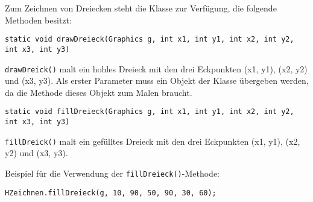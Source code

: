 Zum Zeichnen von Dreiecken steht die Klasse  zur Verfügung,
die folgende Methoden besitzt:

\begin{compactitem}
\item
\lstinline|static void drawDreieck(Graphics g, int x1, int y1, int x2, int y2, int x3, int y3)| 

\lstinline|drawDreick()| malt ein hohles Dreieck mit den drei Eckpunkten (x1,
y1), (x2, y2) und (x3, y3). Als erster Parameter muss ein Objekt der
Klasse  übergeben werden, da die Methode dieses Objekt zum
Malen braucht.
\item
\lstinline|static void fillDreieck(Graphics g, int x1, int y1, int x2, int y2, int x3, int y3)|

\lstinline|fillDreick()| malt ein gefülltes Dreieck mit den drei Eckpunkten (x1,
y1), (x2, y2) und (x3, y3).
\end{compactitem}

Beispiel für die Verwendung der \lstinline|fillDreieck()|-Methode:

\begin{lstlisting}
HZeichnen.fillDreieck(g, 10, 90, 50, 90, 30, 60);
\end{lstlisting}
